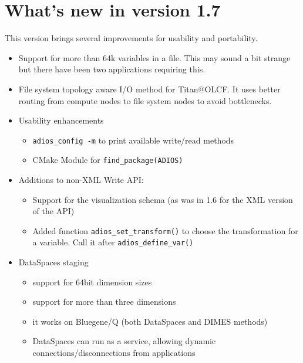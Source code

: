 %
%

\section {What's new in version 1.7}
This version brings several improvements for usability and portability. 
\begin{itemize}
\item Support for more than 64k variables in a file. This may sound a bit strange but there have been two applications requiring this.
\item File system topology aware I/O method for Titan@OLCF. It uses better routing from compute nodes to file system nodes to
           avoid bottlenecks. 
           
\item Usability enhancements
    \begin{itemize}
    \item \verb+adios_config -m+ to print available write/read methods
    \item CMake Module for \verb+find_package(ADIOS)+
    \end{itemize}
    
 \item Additions to non-XML Write API:
     \begin{itemize}
     \item Support for the visualization schema (as was in 1.6 for the XML version of the API)
     \item Added function \verb+adios_set_transform()+ to choose the transformation for a variable. Call it after \verb+adios_define_var()+
     \end{itemize}
            
\item DataSpaces staging
     \begin{itemize}
     \item support for 64bit dimension sizes
     \item support for more than three dimensions
     \item it works on Bluegene/Q (both DataSpaces and DIMES methods)
     \item DataSpaces can run as a service, allowing dynamic connections/disconnections from applications
     \end{itemize}
     
\end{itemize}

